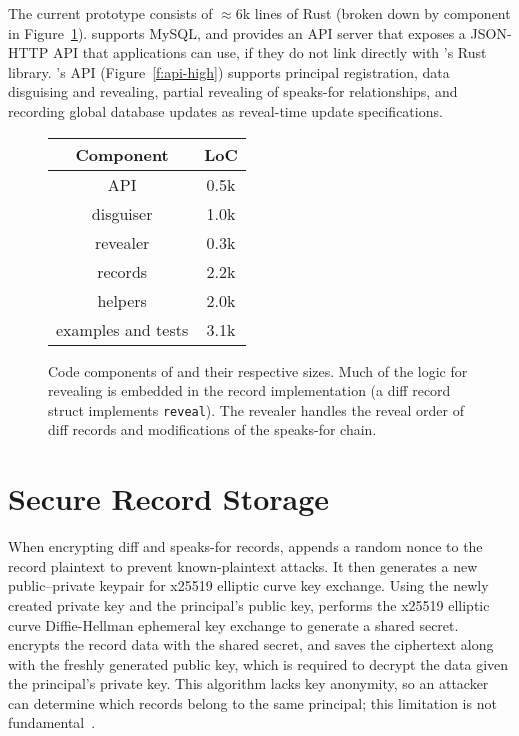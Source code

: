 
The current \sys prototype consists of $\approx6$k lines of Rust (broken down by component in
Figure~\ref{f:loc}). 
%
\sys supports MySQL, and provides an API server that exposes a JSON-HTTP API that applications
can use, if they do not link directly with \sys's Rust library.
%
\sys's API (Figure~\ref{f:api-high}) supports principal registration, data disguising and revealing,
partial revealing of speaks-for relationships, and recording global database
updates as reveal-time update specifications.
%

\begin{figure}[h]
\centering
\begin{tabular}{cc}
    \textbf{Component} & \textbf{LoC} \\
\hline
    API & 0.5k\\
    disguiser & 1.0k\\
    revealer & 0.3k \\
    records & 2.2k \\
    helpers & 2.0k \\
    examples and tests & 3.1k\\

\end{tabular}
    \caption[\sys's code components and LoC.]{Code components of \sys and their respective sizes. Much
    of the logic for revealing is embedded in the record implementation (\eg a
    diff record struct implements \texttt{reveal}). The revealer handles the
    reveal order of diff records and modifications of the speaks-for
    chain.} 
    \label{f:loc}
\end{figure}

%


\section{Secure Record Storage}
%
When encrypting diff and speaks-for records, \sys appends a random nonce to
the record plaintext to prevent known-plaintext attacks.
%
It then generates a new public--private keypair for x25519 elliptic curve key
exchange.
%
Using the newly created private key and the principal's public key, \sys
performs the x25519 elliptic curve Diffie-Hellman ephemeral key exchange to
generate a shared secret.
%
\sys encrypts the record data with the shared secret, and saves the ciphertext
along with the freshly generated public key, which is required to decrypt the
data given the principal's private key.
%
This algorithm lacks key anonymity, so an attacker can determine
which records belong to the same principal; this limitation is not
fundamental~\cite{anonymous-keys}.


